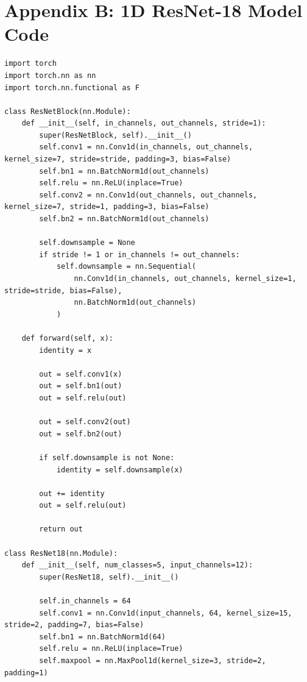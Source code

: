 \documentclass[12pt,a4paper]{report}
\begin{document}
\clearpage

\chapter*{Appendix B: 1D ResNet-18 Model Code}
\label{app:cnn}

\begin{lstlisting}[caption={1D adapted ResNet-18 Architecture (src/models/cnn.py)}]
import torch
import torch.nn as nn
import torch.nn.functional as F

class ResNetBlock(nn.Module):
    def __init__(self, in_channels, out_channels, stride=1):
        super(ResNetBlock, self).__init__()
        self.conv1 = nn.Conv1d(in_channels, out_channels, kernel_size=7, stride=stride, padding=3, bias=False)
        self.bn1 = nn.BatchNorm1d(out_channels)
        self.relu = nn.ReLU(inplace=True)
        self.conv2 = nn.Conv1d(out_channels, out_channels, kernel_size=7, stride=1, padding=3, bias=False)
        self.bn2 = nn.BatchNorm1d(out_channels)
        
        self.downsample = None
        if stride != 1 or in_channels != out_channels:
            self.downsample = nn.Sequential(
                nn.Conv1d(in_channels, out_channels, kernel_size=1, stride=stride, bias=False),
                nn.BatchNorm1d(out_channels)
            )

    def forward(self, x):
        identity = x
        
        out = self.conv1(x)
        out = self.bn1(out)
        out = self.relu(out)
        
        out = self.conv2(out)
        out = self.bn2(out)
        
        if self.downsample is not None:
            identity = self.downsample(x)
            
        out += identity
        out = self.relu(out)
        
        return out

class ResNet18(nn.Module):
    def __init__(self, num_classes=5, input_channels=12):
        super(ResNet18, self).__init__()
        
        self.in_channels = 64
        self.conv1 = nn.Conv1d(input_channels, 64, kernel_size=15, stride=2, padding=7, bias=False)
        self.bn1 = nn.BatchNorm1d(64)
        self.relu = nn.ReLU(inplace=True)
        self.maxpool = nn.MaxPool1d(kernel_size=3, stride=2, padding=1)
        

\end{lstlisting}
\end{document}
